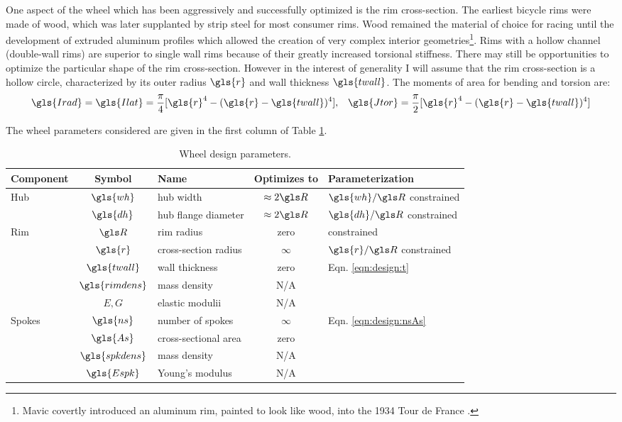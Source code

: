 \documentclass[\rootdir/thesis.tex]{subfiles}
\begin{document}
One aspect of the wheel which has been aggressively and successfully optimized is the rim cross-section. The earliest bicycle rims were made of wood, which was later supplanted by strip steel for most consumer rims. Wood remained the material of choice for racing until the development of extruded aluminum profiles which allowed the creation of very complex interior geometries\footnote{Mavic covertly introduced an aluminum rim, painted to look like wood, into the 1934 Tour de France \cite{Herlihy2004}.}. Rims with a hollow channel (double-wall rims) are superior to single wall rims because of their greatly increased torsional stiffness. There may still be opportunities to optimize the particular shape of the rim cross-section. However in the interest of generality I will assume that the rim cross-section is a hollow circle, characterized by its outer radius $\gls{r}$ and wall thickness $\gls{twall}$. The moments of area for bending and torsion are:
\begin{equation}
\gls{Irad} = \gls{Ilat} = \frac{\pi}{4} [\gls{r}^4 - (\gls{r}-\gls{twall})^4], \,\,\,\,\,
\gls{Jtor} = \frac{\pi}{2} [\gls{r}^4 - (\gls{r}-\gls{twall})^4]
\end{equation}

The wheel parameters considered are given in the first column of Table \ref{tab:design_space}.

\begin{table}
\caption[Design parameters for optimization]{Wheel design parameters.}
\label{tab:design_space}
\begin{tabular}{lclcl}
\toprule
\bf Component & \bf Symbol & \bf Name & \bf Optimizes to & \bf Parameterization\\
\midrule
\multirow{2}{*}{Hub} & $\gls{wh}$ & hub width            & $\approx 2\R$ & $\gls{wh}/\R$ constrained\\
                     & $\gls{dh}$ & hub flange diameter  & $\approx 2\R$ & $\gls{dh}/\R$ constrained\\
\midrule
\multirow{5}{*}{Rim} & $\R$            & rim radius           & zero     & constrained\\
                     & $\gls{r}$       & cross-section radius & $\infty$ & $\gls{r}/\R$ constrained\\
                     & $\gls{twall}$   & wall thickness       & zero     & Eqn. \eqref{eqn:design:t}\\
                     & $\gls{rimdens}$ & mass density         & N/A\\
                     & $E,G$           & elastic modulii      & N/A\\
\midrule
\multirow{4}{*}{Spokes} & $\gls{ns}$      & number of spokes  & $\infty$ & \multirow{2}{*}{Eqn. \eqref{eqn:design:nsAs}}\\
                        & $\gls{As}$      & cross-sectional area & zero\\
                        & $\gls{spkdens}$ & mass density   & N/A\\
                        & $\gls{Espk}$    & Young's modulus & N/A\\
\bottomrule
\end{tabular}
\end{table}
\end{document}

